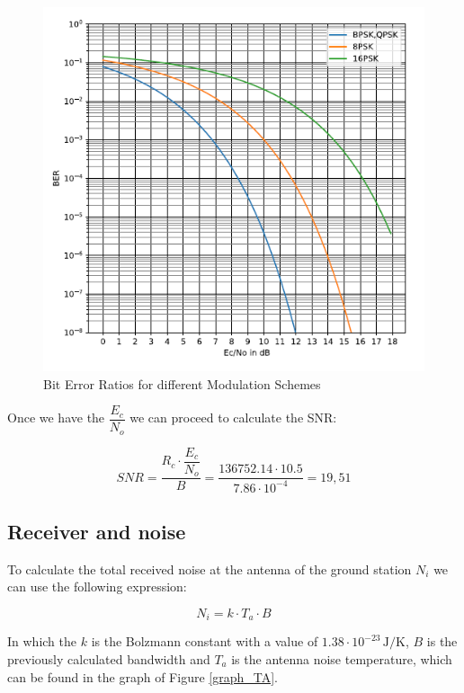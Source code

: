 \documentclass[a4paper,12pt,calibri,oneside,openany]{book}
\newcommand{\unit}[1]{\ensuremath{\, \mathrm{#1}}}
\theoremstyle{break}
\begin{document}
		\begin{figure}[h]
			\centering
			\includegraphics[width=14cm]{graph_BER}
			\caption{Bit Error Ratios for different Modulation Schemes }
			\label{graf_BER}
		\end{figure}
	
		Once we have the $\dfrac{E_{c}}{N_{o}}$ we can proceed to calculate the SNR:
		
		\begin{equation} \label{eq_snr}
			SNR = \dfrac{R_{c} \cdot \dfrac{E_{c}} {N_{o}}}{B} = \dfrac{136752.14 \cdot 10.5} {7.86 \cdot 10^{-4}} = 19,51
		\end{equation}
		
	\subsection{Receiver and noise}	
		
		 To calculate the total received noise at the antenna of the ground station $N_{i}$ we can use the following expression: 
		 
		 \begin{equation} \label{eq_ni}
		 	N_{i} = k \cdot T_{a} \cdot B
		 \end{equation}
	
		In which the $k$ is the Bolzmann constant with a value of $ 1.38 \cdot 10^{-23} \unit{J/K}$, $B$ is the previously calculated bandwidth and $T_{a}$ is the antenna noise temperature, which can be found in the graph of Figure \ref{graph_TA}.
		
\end{document}
